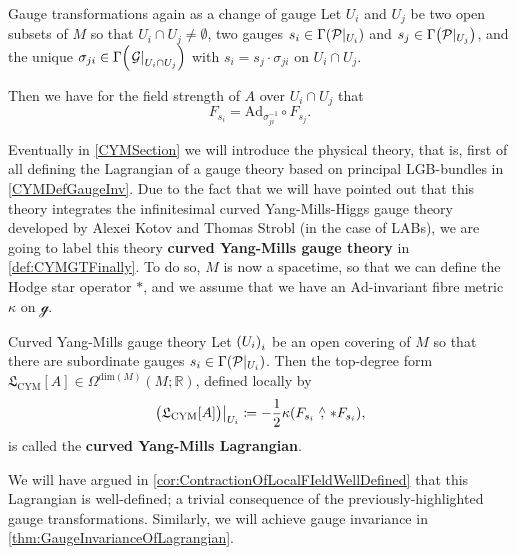 \documentclass[reqno,a4paper,oneside]{amsart}
\theoremstyle{plain}
\theoremstyle{remark}
\theoremstyle{definition}
\begin{document}
\begin{propositions*}{Gauge transformations again as a change of gauge}
Let $U_i$ and $U_j$ be two open subsets of $M$ so that $U_i \cap U_j \neq \emptyset$, two gauges $s_i \in \Gamma\mleft(\mathcal{P}|_{U_i}\mright)$ and $s_j \in \Gamma\mleft(\mathcal{P}|_{U_j}\mright)$, and the unique $\sigma_{ji} \in \Gamma\mleft( \mleft.\mathcal{G}\mright|_{U_i \cap U_j} \mright)$ with $s_i = s_j \cdot \sigma_{ji}$ on $U_i \cap U_j$.

Then we have for the field strength of $A$ over $U_i \cap U_j$ that
\begin{equation*}
F_{s_i}
=
\mathrm{Ad}_{\sigma_{ji}^{-1}}\circ F_{s_j}.
\end{equation*}
\end{propositions*}

Eventually in \ref{CYMSection} we will introduce the physical theory, that is, first of all defining the Lagrangian of a gauge theory based on principal LGB-bundles in \ref{CYMDefGaugeInv}. Due to the fact that we will have pointed out that this theory integrates the infinitesimal curved Yang-Mills-Higgs gauge theory developed by Alexei Kotov and Thomas Strobl (in the case of LABs), we are going to label this theory \textbf{curved Yang-Mills gauge theory} in \ref{def:CYMGTFinally}. To do so, $M$ is now a spacetime, so that we can define the Hodge star operator $*$, and we assume that we have an $\mathrm{Ad}$-invariant fibre metric $\kappa$ on $\mathcal{g}$.

\begin{definitions*}{Curved Yang-Mills gauge theory}
Let $\mleft( U_i \mright)_i$ be an open covering of $M$ so that there are subordinate gauges $s_i \in \Gamma\mleft(\mathcal{P}|_{U_i}\mright)$. Then the top-degree form $\mathfrak{L}_{\mathrm{CYM}}[A] \in \Omega^{\mathrm{dim}(M)}(M; \mathbb{R})$, defined locally by
\begin{equation*}
\mleft.\bigl(\mathfrak{L}_{\mathrm{CYM}}[A]\bigr)\mright|_{U_i}
\coloneqq 
- \frac{1}{2} \kappa \mleft( F_{s_i} \stackrel{\wedge}{,} *F_{s_i} \mright),
\end{equation*}
is called the \textbf{curved Yang-Mills Lagrangian}.
\end{definitions*}

We will have argued in \ref{cor:ContractionOfLocalFIeldWellDefined} that this Lagrangian is well-defined; a trivial consequence of the previously-highlighted gauge transformations. Similarly, we will achieve gauge invariance in \ref{thm:GaugeInvarianceOfLagrangian}.
\end{document}
